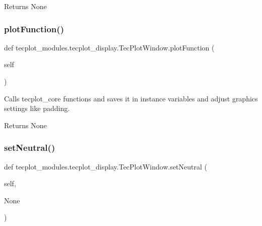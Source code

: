 \begin{DoxyReturn}{Returns}
None 
\end{DoxyReturn}
\hypertarget{classtecplot__modules_1_1tecplot__display_1_1_tec_plot_window_a62c9724fbeda8d8780e57559bada3282}{}\label{classtecplot__modules_1_1tecplot__display_1_1_tec_plot_window_a62c9724fbeda8d8780e57559bada3282} 
\subsubsection{\texorpdfstring{plot\+Function()}{plotFunction()}}
{\footnotesize\ttfamily def tecplot\+\_\+modules.\+tecplot\+\_\+display.\+Tec\+Plot\+Window.\+plot\+Function (\begin{DoxyParamCaption}\item[{}]{self }\end{DoxyParamCaption})}



Calls tecplot\+\_\+core functions and saves it in instance variables and adjust graphics settings like padding. 

\begin{DoxyReturn}{Returns}
None 
\end{DoxyReturn}
\hypertarget{classtecplot__modules_1_1tecplot__display_1_1_tec_plot_window_ad80163041f7884f536d1421860c4adc2}{}\label{classtecplot__modules_1_1tecplot__display_1_1_tec_plot_window_ad80163041f7884f536d1421860c4adc2} 
\subsubsection{\texorpdfstring{set\+Neutral()}{setNeutral()}}
{\footnotesize\ttfamily def tecplot\+\_\+modules.\+tecplot\+\_\+display.\+Tec\+Plot\+Window.\+set\+Neutral (\begin{DoxyParamCaption}\item[{}]{self,  }\item[{}]{None }\end{DoxyParamCaption})}



